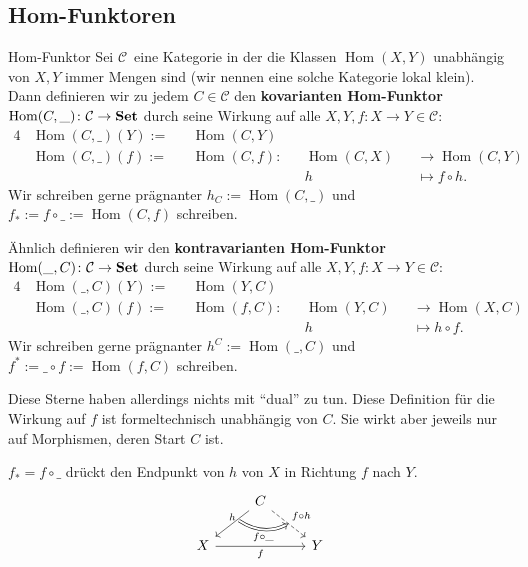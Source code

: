 \documentclass[a4paper]{amsart}
\theoremstyle{definition}
\DeclareMathOperator{\Hom}{Hom}
\newcommand{\CC}{\ensuremath{\mathcal{ C }}}
\newcommand{\Set}{\text{\textbf{Set}}}
\begin{document}
\subsection{Hom-Funktoren}
\begin{Definition}{Hom-Funktor}
   Sei \CC\ eine Kategorie in der die Klassen $\Hom(X,Y)$ unabhängig von $X,Y$ immer Mengen sind (wir nennen eine solche Kategorie lokal klein). Dann definieren wir zu jedem $C \in \CC$ den \textbf{kovarianten Hom-Funktor} $\Hom(C, \_) \colon \CC \to \Set$ durch seine Wirkung auf alle $X,Y, f \colon X \to Y \in \CC$:
   \begin{alignat}{4}
      &\Hom(C, \_)( Y ) := &&\Hom(C, Y)\\
      &\Hom(C, \_)( f ) := &&\Hom(C, f ) \colon &&\Hom(C, X ) &&\to \Hom(C, Y )\\
      &                    &&                   &&h           &&\mapsto f \circ h.
   \end{alignat}
   Wir schreiben gerne prägnanter $h_C := \Hom(C, \_)$ und  $f_* := f \circ \_ := \Hom(C, f )$ schreiben.
   
   Ähnlich definieren wir den \textbf{kontravarianten Hom-Funktor} $\Hom(\_, C) \colon \CC \to \Set$ durch seine Wirkung auf alle $X,Y, f \colon X \to Y \in \CC$:
   \begin{alignat}{4}
      &\Hom(\_, C)( Y ) := &&\Hom(Y, C)\\
      &\Hom(\_, C)( f ) := &&\Hom( f, C ) \colon &&\Hom(Y, C ) &&\to \Hom(X, C )\\
      &                    &&                   &&h           &&\mapsto h \circ f.
   \end{alignat}
   Wir schreiben gerne prägnanter $h^C := \Hom(\_, C)$ und  $f^* := \_ \circ f := \Hom( f, C )$ schreiben.
\end{Definition}   
Diese Sterne haben allerdings nichts mit "`dual"' zu tun. Diese Definition für die Wirkung auf $f$ ist formeltechnisch unabhängig von $C$. Sie wirkt aber jeweils nur auf Morphismen, deren Start $C$ ist.

$f_* = f \circ \_$ drückt den Endpunkt von $h$ von $X$ in Richtung $f$ nach $Y$.
\begin{equation}
   \begin{tikzcd}
                         &C   \arrow[dl, "h"{above, name=0}] \arrow[dr, dashed, "f \circ h"{name=1}] \\
      X \arrow[rr, "f"{below}]  &        &Y
      \arrow[Rightarrow, bend right, from=0, to=1, "f \circ \_"{below}]
   \end{tikzcd}
\end{equation}
\end{document}
